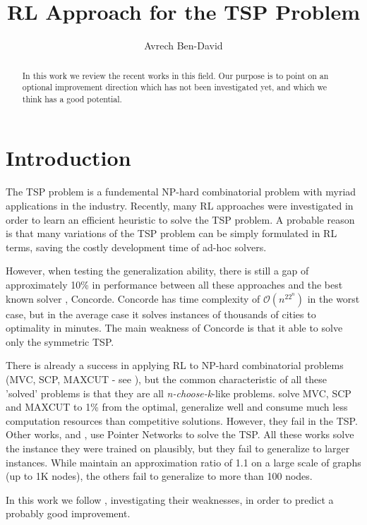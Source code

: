 \documentclass[10pt,a4paper,draft]{article}
\begin{document}
\title{RL Approach for the TSP Problem}
\author{Avrech Ben-David}
\maketitle
\begin{abstract}
In this work we review the recent works in this field. Our purpose is to point on an optional improvement direction which has not been investigated yet, and which we think has a good potential. 
\end{abstract}
\section{Introduction}
The TSP problem is a fundemental NP-hard combinatorial problem with myriad applications in the industry. Recently, many RL approaches were investigated in order to learn an efficient heuristic to solve the TSP problem. A probable reason is that many variations of the TSP problem can be simply formulated in RL terms, saving the costly development time of ad-hoc solvers. 

However, when testing the generalization ability, there is still a gap of approximately 10\% in performance between all these approaches and the best known solver \cite{concorde}, Concorde. Concorde has time complexity of $\mathcal{O}(n^22^n)$ in the worst case, but in the average case it solves instances of thousands of cities to optimality in minutes. The main weakness of Concorde is that it able to solve only the symmetric TSP. 

There is already a success in applying RL to NP-hard combinatorial problems (MVC, SCP, MAXCUT - see \cite{dai17-tsp-s2v}), but the common characteristic of all these 'solved' problems is that they are all \textit{n-choose-k}-like problems. \cite{dai17-tsp-s2v} solve MVC, SCP and MAXCUT to 1\% from the optimal, generalize well and consume much less computation resources than competitive solutions. However, they fail in the TSP. Other works, \cite{bello16-tsp-pnac} and \cite{deudon18-tsp-nr2opt}, use Pointer Networks to solve the TSP. All these works solve the instance they were trained on plausibly, but they fail to generalize to larger instances. While \cite{dai17-tsp-s2v} maintain an approximation ratio of 1.1 on a large scale of graphs (up to 1K nodes), the others fail to generalize to more than 100 nodes. 

In this work we follow \cite{dai17-tsp-s2v}, investigating their weaknesses, in order to predict a probably good improvement.
\end{document}

